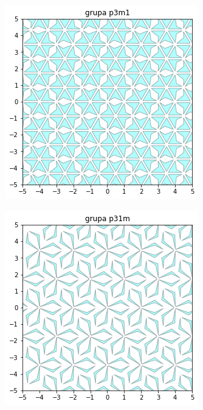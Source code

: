 \documentclass[11pt]{article}
\begin{document}
\begin{figure}[H]
  \begin{subfigure}[b]{0.22\textwidth}
    \includegraphics[width=\textwidth]{output_87_6.png}
    \label{fig:f14}
  \end{subfigure}
  \begin{subfigure}[b]{0.22\textwidth}
    \includegraphics[width=\textwidth]{output_87_7.png}

\end{subfigure}
\end{figure}
\end{document}
